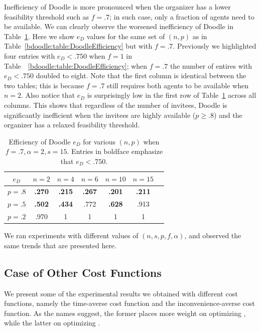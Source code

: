 Inefficiency of Doodle is more pronounced when the organizer has a lower feasibility threshold such as $f = .7$; in such case, only a fraction of agents need to be available. 
We can clearly observe the worsened inefficiency of Doodle in Table~\ref{bdoodle:table:DoodleEfficiency-lower-attendance}. 
Here we show $e_{D}$ values for the same set of $(n, p)$ as in Table~\ref{bdoodle:table:DoodleEfficiency} but with $f = .7$. 
Previously we highlighted four entries with $e_{D} < .750$ when $f = 1$ in Table~~\ref{bdoodle:table:DoodleEfficiency}; when $f = .7$ the number of entires with $e_{D} < .750$ doubled to eight. 
Note that the first column is identical between the two tables; this is because $f = .7$ still requires both agents to be available when $n = 2$. 
Also notice that $e_{D}$ is surprisingly low in the first row of Table~\ref{bdoodle:table:DoodleEfficiency-lower-attendance} across all columns. This shows that regardless of the number of invitees, Doodle is significantly inefficient when the invitees are highly available ($p \geq .8$) and the organizer has a relaxed feasibility threshold.
\begin{table}[h]  %
\centering
\begin{tabular}{|c|c|c|c|c|c|c|}
	\hline
	$e_{D}$ & $n = 2$ & $n = 4$ & $n = 6$ & $ n = 10 $ & $n = 15$ \\ \hline
	$p = .8$ & \textbf{.270} & \textbf{.215} & \textbf{.267} & \textbf{.201} & \textbf{.211} \\ \hline
	$p = .5$ & \textbf{.502} & \textbf{.434} & .772 & \textbf{.628} & .913  \\ \hline
	$p = .2$ & .970 & 1 & 1 & 1 & 1\\ \hline	
\end{tabular}
\caption{Efficiency of Doodle $e_{D}$ for various $(n, p)$ when $f = .7, \alpha=2, s = 15$. 
Entries in boldface emphasize that $e_{D} < .750$.
} \label{bdoodle:table:DoodleEfficiency-lower-attendance}
\end{table}

We ran experiments with different values of $(n, s, p, f, \alpha)$, and observed the same  trends that are presented here.



\subsection{Case of Other Cost Functions}
We present some of the experimental results we obtained with different cost functions, namely the time-averse cost function and the inconvenience-averse cost function. As the names suggest, the former places more weight on optimizing \Time, while the latter on optimizing \Inconvenience. \\

